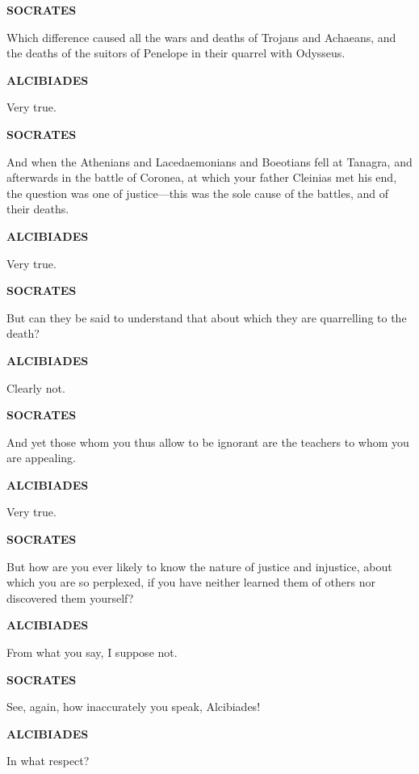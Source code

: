 \documentclass[11pt,letter]{article}
\begin{document}
\par \textbf{SOCRATES}
\par   Which difference caused all the wars and deaths of Trojans and Achaeans, and the deaths of the suitors of Penelope in their quarrel with Odysseus.

\par \textbf{ALCIBIADES}
\par   Very true.

\par \textbf{SOCRATES}
\par   And when the Athenians and Lacedaemonians and Boeotians fell at Tanagra, and afterwards in the battle of Coronea, at which your father Cleinias met his end, the question was one of justice—this was the sole cause of the battles, and of their deaths.

\par \textbf{ALCIBIADES}
\par   Very true.

\par \textbf{SOCRATES}
\par   But can they be said to understand that about which they are quarrelling to the death?

\par \textbf{ALCIBIADES}
\par   Clearly not.

\par \textbf{SOCRATES}
\par   And yet those whom you thus allow to be ignorant are the teachers to whom you are appealing.

\par \textbf{ALCIBIADES}
\par   Very true.

\par \textbf{SOCRATES}
\par   But how are you ever likely to know the nature of justice and injustice, about which you are so perplexed, if you have neither learned them of others nor discovered them yourself?

\par \textbf{ALCIBIADES}
\par   From what you say, I suppose not.

\par \textbf{SOCRATES}
\par   See, again, how inaccurately you speak, Alcibiades!

\par \textbf{ALCIBIADES}
\par   In what respect?
\end{document}
